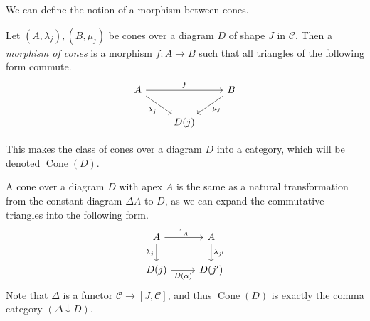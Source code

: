 We can define the notion of a morphism between cones.
\begin{definition}
    Let \( (A, \lambda_j), (B, \mu_j) \) be cones over a diagram \( D \) of shape \( J \) in \( \mathcal C \).
    Then a \emph{morphism of cones} is a morphism \( f : A \to B \) such that all triangles of the following form commute.
\[\begin{tikzcd}
	A && B \\
	& {D(j)}
	\arrow["f", from=1-1, to=1-3]
	\arrow["{\mu_j}", from=1-3, to=2-2]
	\arrow["{\lambda_j}"', from=1-1, to=2-2]
\end{tikzcd}\]
\end{definition}
This makes the class of cones over a diagram \( D \) into a category, which will be denoted \( \operatorname{Cone}(D) \).
\begin{remark}
    A cone over a diagram \( D \) with apex \( A \) is the same as a natural transformation from the constant diagram \( \Delta A \) to \( D \), as we can expand the commutative triangles into the following form.
\[\begin{tikzcd}
	A & A \\
	{D(j)} & {D(j')}
	\arrow["{1_A}", from=1-1, to=1-2]
	\arrow["{\lambda_{j'}}", from=1-2, to=2-2]
	\arrow["{\lambda_j}"', from=1-1, to=2-1]
	\arrow["{D(\alpha)}"', from=2-1, to=2-2]
\end{tikzcd}\]
    Note that \( \Delta \) is a functor \( \mathcal C \to [J, \mathcal C] \), and thus \( \operatorname{Cone}(D) \) is exactly the comma category \( (\Delta \downarrow D) \).
\end{remark}

